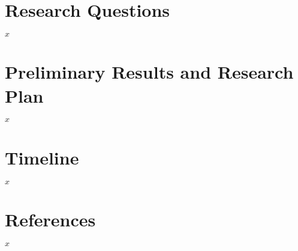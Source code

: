 \documentclass[11pt]{beamer}
\begin{document}
\section{Research Questions}
\begin{frame}

$x$

\end{frame}

\section{Preliminary Results and Research Plan}
\begin{frame}

$x$

\end{frame}


\section{Timeline}
\begin{frame}

$x$

\end{frame}


\section{References}
\begin{frame}

$x$

\end{frame}
\end{document}
